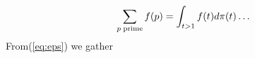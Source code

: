 \documentclass{article}
\begin{document}
\begin{equation}\label{eq:eps}
	\sum_{p\rm\;prime}f(p) = \int_{t>1}f(t)d\pi(t)
\ldots
\end{equation}
From(\ref{eq:eps}) we gather 
\end{document}
